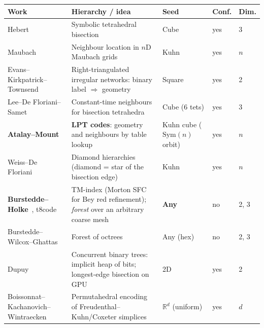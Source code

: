 \documentclass[11pt]{article}
\begin{document}
\begin{center}
\small
\begin{tabularx}{\textwidth}{@{}>{\raggedright\arraybackslash}p{3.4cm}L>{\raggedright\arraybackslash}p{2.1cm}p{1.3cm}p{0.9cm}@{}}
\toprule
Work & Hierarchy / idea & Seed & Conf. & Dim. \\
\midrule
Hebert~\cite{hebert1994} & Symbolic tetrahedral bisection & Cube & yes & 3 \\
Maubach~\cite{maubach1996} & Neighbour location in $n$D Maubach grids & Kuhn & yes & $n$ \\
Evans--Kirkpatrick--Townsend~\cite{ekt2001} & Right-triangulated irregular networks: binary label $\Rightarrow$ geometry & Square & yes & 2 \\
Lee--De Floriani--Samet~\cite{ldfs2001} & Constant-time neighbours for bisection tetrahedra & Cube (6 tets) & yes & 3 \\
\textbf{Atalay--Mount}~\cite{atalaymount2007} & \textbf{LPT codes}: geometry and neighbours by table lookup & Kuhn cube ($\mathrm{Sym}(n)$ orbit) & yes & $n$ \\
Weiss--De Floriani~\cite{weissdefloriani2011} & Diamond hierarchies (diamond = star of the bisection edge) & Kuhn & yes & $n$ \\
\textbf{Burstedde--Holke}~\cite{bursteddeholke2016}, t8code & TM-index (Morton SFC for Bey red refinement); \emph{forest} over an arbitrary coarse mesh & \textbf{Any} & no & 2, 3 \\
Burstedde--Wilcox--Ghattas~\cite{p4est2011} & Forest of octrees & Any (hex) & no & 2, 3 \\
Dupuy~\cite{dupuy2020} & Concurrent binary trees: implicit heap of bits; longest-edge bisection on GPU & 2D & yes & 2 \\
Boissonnat--Kachanovich--Wintraecken~\cite{bkw2023} & Permutahedral encoding of Freudenthal--Kuhn/Coxeter simplices & $\mathbb R^d$ (uniform) & yes & $d$ \\
\bottomrule
\end{tabularx}
\end{center}
\end{document}
